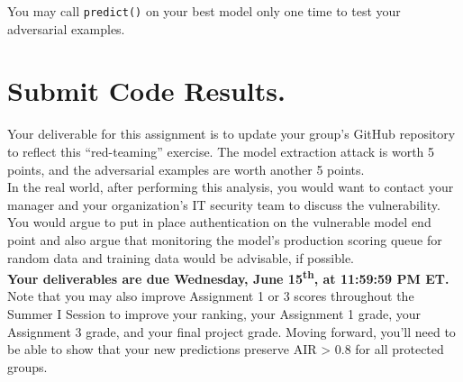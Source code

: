 \documentclass[fleqn]{article}
\begin{document}
\noindent You may call \texttt{predict()} on your best model only one time to test your adversarial examples.

\section{Submit Code Results.}

Your deliverable for this assignment is to update your group's GitHub repository to reflect this ``red-teaming'' exercise. The model extraction attack is worth 5 points, and the adversarial examples are worth another 5 points. \\

\noindent In the real world, after performing this analysis, you would want to contact your manager and your organization's IT security team to discuss the vulnerability. You would argue to put in place authentication on the vulnerable model end point and also argue that monitoring the model's production scoring queue for random data and training data would be advisable, if possible.\\

\noindent \textbf{Your deliverables are due Wednesday, June 15\textsuperscript{th}, at 11:59:59 PM ET.}\\

\noindent Note that you may also improve Assignment 1 or 3 scores throughout the Summer I Session to improve your ranking, your Assignment 1 grade, your Assignment 3 grade, and your final project grade. Moving forward, you'll need to be able to show that your new predictions preserve AIR > 0.8 for all protected groups.
\end{document}
